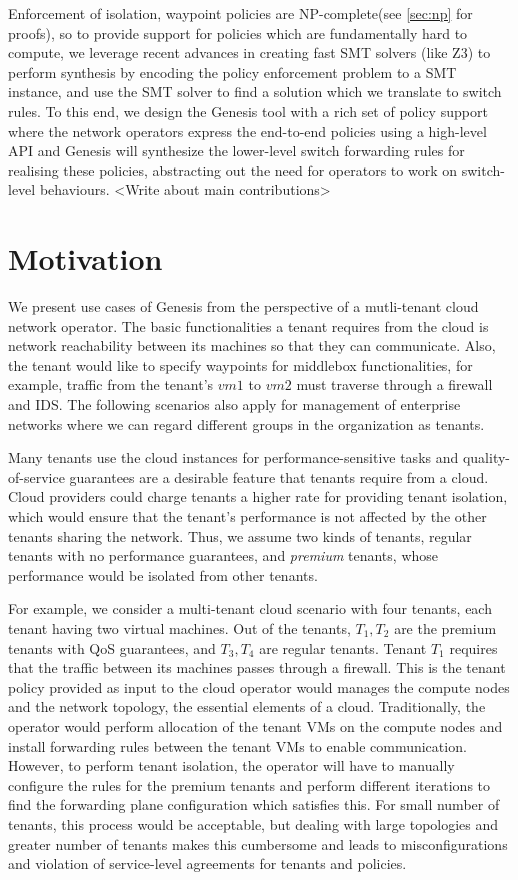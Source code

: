 \documentclass[]{sig}
\begin{document}
 Enforcement of isolation, waypoint policies are NP-complete(see \cref{sec:np} for proofs), so to provide support for policies which are fundamentally hard to compute, we leverage recent advances in creating fast SMT solvers (like Z3) to perform synthesis by encoding the policy enforcement problem to a SMT instance, and use the SMT solver to find a solution which we translate to switch rules. To this end, we design the Genesis tool with a rich set of policy support where the network operators express the end-to-end policies using a high-level API and Genesis will synthesize the lower-level switch forwarding rules for realising these policies, abstracting out the need for operators to work on switch-level behaviours. 
<Write about main contributions> 
\section{Motivation}
We present use cases of Genesis from the perspective of a mutli-tenant cloud network operator. The basic functionalities a tenant requires from the cloud is network reachability between its machines so that they can communicate. Also, the tenant would like to specify waypoints for middlebox functionalities, for example, traffic from the tenant's $vm1$ to $vm2$ must traverse through a firewall and IDS. The following scenarios also apply for management of enterprise networks where we can regard different groups in the organization as tenants. 

Many tenants use the cloud instances for performance-sensitive tasks and quality-of-service guarantees are a desirable feature that tenants require from a cloud. Cloud providers could charge tenants a higher rate for providing tenant isolation, which would ensure that the tenant's performance is not affected by the other tenants sharing the network. Thus, we assume two kinds of tenants, regular tenants with no performance guarantees, and \emph{premium} tenants, whose performance would be isolated from other tenants. 

For example, we consider a multi-tenant cloud scenario with four tenants, each tenant having two virtual machines. Out of the tenants, $T_1, T_2$ are the premium tenants with QoS guarantees, and $T_3, T_4$ are regular tenants. Tenant $T_1$ requires that the traffic between its machines passes through a firewall. This is the tenant policy provided as input to the cloud operator would manages the compute nodes and the network topology, the essential elements of a cloud. Traditionally, the operator would perform allocation of the tenant VMs on the compute nodes and install forwarding rules between the tenant VMs to enable communication. However, to perform tenant isolation, the operator will have to manually configure the rules for the premium tenants and perform different iterations to find the forwarding plane configuration which satisfies this. For small number of tenants, this process would be acceptable, but dealing with large topologies and greater number of tenants makes this cumbersome and leads to misconfigurations and violation of service-level agreements for tenants and policies. 
\end{document}
